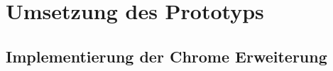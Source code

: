 \chapter{Umsetzung des Prototyps}
\label{chap:umsetzung_des_prototyps}

\section{Implementierung der Chrome Erweiterung}

